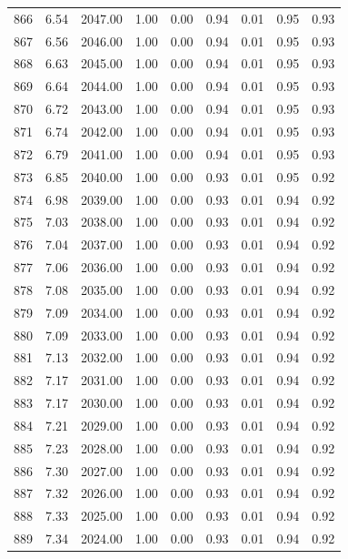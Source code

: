 \documentclass{article}\usepackage[]{graphicx}\usepackage[]{color}
\begin{document}
\begin{longtable}{rrrrrrrrr}
  866 & 6.54 & 2047.00 & 1.00 & 0.00 & 0.94 & 0.01 & 0.95 & 0.93 \\ 
  867 & 6.56 & 2046.00 & 1.00 & 0.00 & 0.94 & 0.01 & 0.95 & 0.93 \\ 
  868 & 6.63 & 2045.00 & 1.00 & 0.00 & 0.94 & 0.01 & 0.95 & 0.93 \\ 
  869 & 6.64 & 2044.00 & 1.00 & 0.00 & 0.94 & 0.01 & 0.95 & 0.93 \\ 
  870 & 6.72 & 2043.00 & 1.00 & 0.00 & 0.94 & 0.01 & 0.95 & 0.93 \\ 
  871 & 6.74 & 2042.00 & 1.00 & 0.00 & 0.94 & 0.01 & 0.95 & 0.93 \\ 
  872 & 6.79 & 2041.00 & 1.00 & 0.00 & 0.94 & 0.01 & 0.95 & 0.93 \\ 
  873 & 6.85 & 2040.00 & 1.00 & 0.00 & 0.93 & 0.01 & 0.95 & 0.92 \\ 
  874 & 6.98 & 2039.00 & 1.00 & 0.00 & 0.93 & 0.01 & 0.94 & 0.92 \\ 
  875 & 7.03 & 2038.00 & 1.00 & 0.00 & 0.93 & 0.01 & 0.94 & 0.92 \\ 
  876 & 7.04 & 2037.00 & 1.00 & 0.00 & 0.93 & 0.01 & 0.94 & 0.92 \\ 
  877 & 7.06 & 2036.00 & 1.00 & 0.00 & 0.93 & 0.01 & 0.94 & 0.92 \\ 
  878 & 7.08 & 2035.00 & 1.00 & 0.00 & 0.93 & 0.01 & 0.94 & 0.92 \\ 
  879 & 7.09 & 2034.00 & 1.00 & 0.00 & 0.93 & 0.01 & 0.94 & 0.92 \\ 
  880 & 7.09 & 2033.00 & 1.00 & 0.00 & 0.93 & 0.01 & 0.94 & 0.92 \\ 
  881 & 7.13 & 2032.00 & 1.00 & 0.00 & 0.93 & 0.01 & 0.94 & 0.92 \\ 
  882 & 7.17 & 2031.00 & 1.00 & 0.00 & 0.93 & 0.01 & 0.94 & 0.92 \\ 
  883 & 7.17 & 2030.00 & 1.00 & 0.00 & 0.93 & 0.01 & 0.94 & 0.92 \\ 
  884 & 7.21 & 2029.00 & 1.00 & 0.00 & 0.93 & 0.01 & 0.94 & 0.92 \\ 
  885 & 7.23 & 2028.00 & 1.00 & 0.00 & 0.93 & 0.01 & 0.94 & 0.92 \\ 
  886 & 7.30 & 2027.00 & 1.00 & 0.00 & 0.93 & 0.01 & 0.94 & 0.92 \\ 
  887 & 7.32 & 2026.00 & 1.00 & 0.00 & 0.93 & 0.01 & 0.94 & 0.92 \\ 
  888 & 7.33 & 2025.00 & 1.00 & 0.00 & 0.93 & 0.01 & 0.94 & 0.92 \\ 
  889 & 7.34 & 2024.00 & 1.00 & 0.00 & 0.93 & 0.01 & 0.94 & 0.92 \\ 

\end{longtable}
\end{document}
